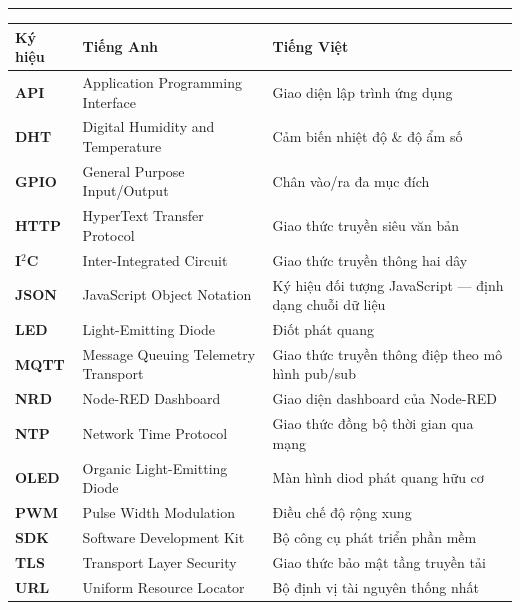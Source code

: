 \documentclass[13pt,a4paper]{article}
\begin{document}
\newpage
\thispagestyle{empty}
\vspace*{0.4cm}
\begin{center}
    \fontsize{19}{24}\selectfont\bfseries{}\par
    \vspace{0.25ex}
    \rule{0.45\textwidth}{1.8pt}
\end{center}
\vspace{0.65cm}

{}

\noindent
\begin{longtable}[l]{@{}p{3.0cm}p{4.4cm}p{7.4cm}@{}}
    \toprule
    \centering\textbf{Ký hiệu} & \centering\textbf{Tiếng Anh} & \centering\textbf{Tiếng Việt} \\
    \midrule\endhead
    \bottomrule\endfoot
    \textbf{API}   & Application Programming Interface   & Giao diện lập trình ứng dụng \\[0.3ex]
    \textbf{DHT}   & Digital Humidity and Temperature   & Cảm biến nhiệt độ \& độ ẩm số \\[0.3ex]
    \textbf{GPIO}  & General Purpose Input/Output       & Chân vào/ra đa mục đích \\[0.3ex]
    \textbf{HTTP}  & HyperText Transfer Protocol       & Giao thức truyền siêu văn bản \\[0.3ex]
    \textbf{I$^2$C} & Inter-Integrated Circuit          & Giao thức truyền thông hai dây \\[0.3ex]
    \textbf{JSON}  & JavaScript Object Notation        & Ký hiệu đối tượng JavaScript --- định dạng chuỗi dữ liệu \\[0.3ex]
    \textbf{LED}   & Light-Emitting Diode               & Điốt phát quang \\[0.3ex]
    \textbf{MQTT}  & Message Queuing Telemetry Transport & Giao thức truyền thông điệp theo mô hình pub/sub \\[0.3ex]
    \textbf{NRD}   & Node-RED Dashboard                 & Giao diện dashboard của Node-RED \\[0.3ex]
    \textbf{NTP}   & Network Time Protocol               & Giao thức đồng bộ thời gian qua mạng \\[0.3ex]
    \textbf{OLED}  & Organic Light-Emitting Diode        & Màn hình diod phát quang hữu cơ \\[0.3ex]
    \textbf{PWM}   & Pulse Width Modulation              & Điều chế độ rộng xung \\[0.3ex]
    \textbf{SDK}   & Software Development Kit            & Bộ công cụ phát triển phần mềm \\[0.3ex]
    \textbf{TLS}   & Transport Layer Security            & Giao thức bảo mật tầng truyền tải \\[0.3ex]
    \textbf{URL}   & Uniform Resource Locator           & Bộ định vị tài nguyên thống nhất
\end{longtable}
\end{document}
